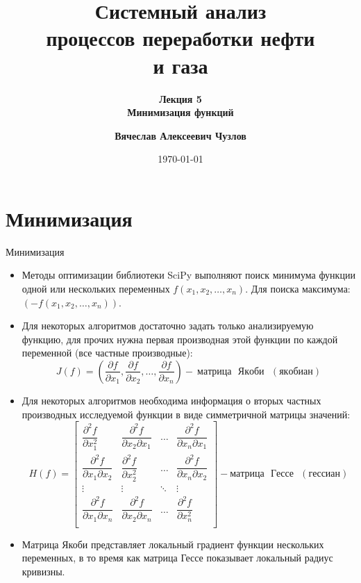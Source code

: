 \documentclass[aspectratio=169, mathserif]{beamer}	%
\title{\Large{Системный анализ \\ процессов переработки нефти \\ и газа}}
\subtitle{\textcolor{tpugreen}{\textbf{Лекция 5}} \\ \textbf{Минимизация функций}}
\author[]{\textbf{Вячеслав Алексеевич Чузлов}}
\institute{к.т.н., доцент ОХИ ИШПР}
\date{\today}
\begin{document}

\titleframe		%

\tocframe{}		%


\section{Минимизация}
\sectionframe

\begin{frame}[fragile]{Минимизация}
\scriptsize
\begin{itemize}
\item Методы оптимизации библиотеки SciPy выполняют поиск минимума функции одной или нескольких переменных $f(x_1, x_2, \dots, x_n)$. Для поиска максимума: $\left(-f(x_1, x_2, \dots, x_n)\right)$.

\item Для некоторых алгоритмов достаточно задать только анализируемую функцию, для прочих нужна первая производная этой функции по каждой переменной (все частные производные):
\vfill
\begin{equation}
	J(f) = \left(\dfrac{\partial f}{\partial x_1}, \dfrac{\partial f}{\partial x_2}, \dots, \dfrac{\partial f}{\partial x_n}\right) - \mathrm{~матрица \text{ } Якоби \text{ } (якобиан)}
\end{equation}
\vfill
\item Для некоторых алгоритмов необходима информация о вторых частных производных исследуемой функции в виде симметричной матрицы значений:
\vfill
\begin{equation}
H(f) =
\begin{bmatrix}
	 \dfrac{\partial^2 f}{\partial x^2_1} & \dfrac{\partial^2 f}{\partial x_2 \partial x_1}
	 & \dots & \dfrac{\partial^2 f}{\partial x_n \partial x_1} \\

	 \dfrac{\partial^2 f}{\partial x_1 \partial x_2} & \dfrac{\partial^2 f}{\partial x^2_2}
	 & \dots & \dfrac{\partial^2 f}{\partial x_n \partial x_2} \\

	 \vdots & \vdots & \ddots & \vdots \\

	 \dfrac{\partial^2 f}{\partial x_1 \partial x_n} & \dfrac{\partial^2 f}{\partial x_2 \partial x_n}
	 & \dots & \dfrac{\partial^2 f}{\partial x^2_n} \\
\end{bmatrix} - \mathrm{матрица \text{ } Гессе \text{ } (гессиан)}
\end{equation}
\vfill
\item Матрица Якоби представляет локальный градиент функции нескольких переменных, в то время как матрица Гессе показывает локальный радиус кривизны.
\end{itemize}
\vfill
\end{frame}
\end{document}
